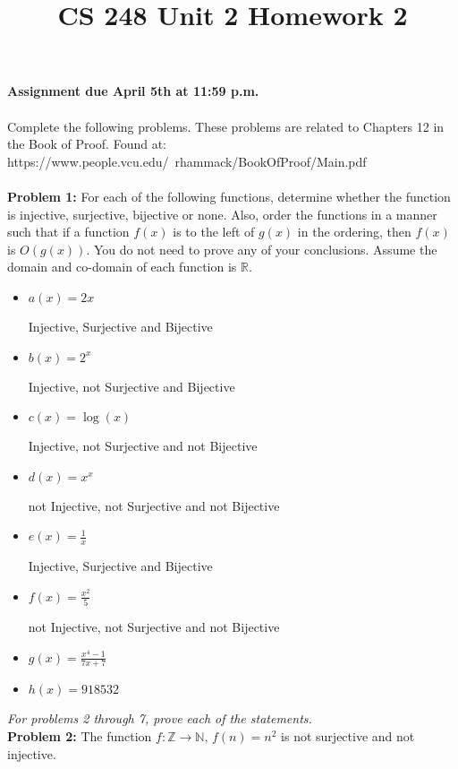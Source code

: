 \documentclass[12pt]{article}
\title{CS 248 Unit 2 Homework 2}
\def\R{\mathbb R} %
\def\Z{\mathbb Z}
\def\N{\mathbb N}
\begin{document}
\textbf{Assignment due April 5th at 11:59 p.m. \\ \\
}Complete the following problems. These problems are related to Chapters 12 in the Book of Proof. Found at: \\ https://www.people.vcu.edu/~rhammack/BookOfProof/Main.pdf \\ \\

{\bf Problem 1:} For each of the following functions, determine whether the function is injective, surjective, bijective or none. Also, order the functions in a manner such that if a function $f(x)$ is to the left of $g(x)$ in the ordering, then $f(x)$ is $O(g(x)).$ You do not need to prove any of your conclusions. Assume the domain and co-domain of each function is $\R$.
\begin{itemize}
    \item $a(x) = 2x$
    
    Injective, Surjective and Bijective

    \item $b(x) = 2^x$
    
    Injective, not Surjective and Bijective

    \item $c(x) = \log(x)$
    
    Injective, not Surjective and not Bijective

    \item $d(x) = x^x$
    
    not Injective, not Surjective and not Bijective

    \item $e(x) = \frac{1}{x}$
    
    Injective, Surjective and Bijective

    \item $f(x) = \frac{x^2}{5}$
    
    not Injective, not Surjective and not Bijective

    \item $g(x) = \frac{x^4-1}{7x+7}$
    
    

    \item $h(x) = 918532$
\end{itemize} 

\textit{For problems 2 through 7, prove each of the statements.} \\ 

{\bf Problem 2:} The function $f:\Z \rightarrow \N$, $f(n)= n^2$ is not surjective and not injective.\\
\end{document}
